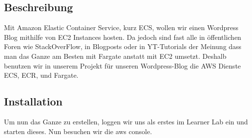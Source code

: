 \documentclass{article}
\begin{document}
\subsection{Beschreibung}

\noindent Mit Amazon Elastic Container Service, kurz ECS, wollen wir einen Wordpress Blog mithilfe von EC2 Instances hosten. Da jedoch sind fast alle in öffentlichen Foren wie StackOverFlow, in Blogposts oder in YT-Tutorials der Meinung dass man das Ganze am Besten mit Fargate anstatt mit EC2 umsetzt. Deshalb benutzen wir in unserem Projekt für unseren Wordpress-Blog die AWS Dienste ECS, ECR, und Fargate.
\newline 

\subsection{Installation}

\noindent Um nun das Ganze zu erstellen, loggen wir uns als erstes im Learner Lab ein und starten dieses. Nun besuchen wir die aws console.
\end{document}
